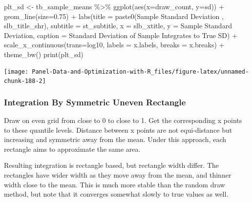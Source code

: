 \documentclass[
]{book}
\newenvironment{Shaded}{\begin{snugshade}}{\end{snugshade}}
\newcommand{\AttributeTok}[1]{\textcolor[rgb]{0.77,0.63,0.00}{#1}}
\newcommand{\FloatTok}[1]{\textcolor[rgb]{0.00,0.00,0.81}{#1}}
\newcommand{\FunctionTok}[1]{\textcolor[rgb]{0.00,0.00,0.00}{#1}}
\newcommand{\NormalTok}[1]{#1}
\newcommand{\OtherTok}[1]{\textcolor[rgb]{0.56,0.35,0.01}{#1}}
\newcommand{\SpecialCharTok}[1]{\textcolor[rgb]{0.00,0.00,0.00}{#1}}
\newcommand{\StringTok}[1]{\textcolor[rgb]{0.31,0.60,0.02}{#1}}
\begin{document}
\begin{Shaded}
\begin{Highlighting}[]
\NormalTok{plt\_sd }\OtherTok{\textless{}{-}}\NormalTok{ tb\_sample\_means }\SpecialCharTok{\%\textgreater{}\%}
  \FunctionTok{ggplot}\NormalTok{(}\FunctionTok{aes}\NormalTok{(}\AttributeTok{x=}\NormalTok{draw\_count, }\AttributeTok{y=}\NormalTok{sd)) }\SpecialCharTok{+}
  \FunctionTok{geom\_line}\NormalTok{(}\AttributeTok{size=}\FloatTok{0.75}\NormalTok{) }\SpecialCharTok{+}
  \FunctionTok{labs}\NormalTok{(}\AttributeTok{title =} \FunctionTok{paste0}\NormalTok{(}\StringTok{\textquotesingle{}Sample Standard Deviation \textquotesingle{}}\NormalTok{, slb\_title\_shr),}
       \AttributeTok{subtitle =}\NormalTok{ st\_subtitle,}
       \AttributeTok{x =}\NormalTok{ slb\_xtitle,}
       \AttributeTok{y =} \StringTok{\textquotesingle{}Sample Standard Deviation\textquotesingle{}}\NormalTok{,}
       \AttributeTok{caption =} \StringTok{\textquotesingle{}Standard Deviation of Sample Integrates to True SD\textquotesingle{}}\NormalTok{) }\SpecialCharTok{+}
  \FunctionTok{scale\_x\_continuous}\NormalTok{(}\AttributeTok{trans=}\StringTok{\textquotesingle{}log10\textquotesingle{}}\NormalTok{, }\AttributeTok{labels =}\NormalTok{ x.labels, }\AttributeTok{breaks =}\NormalTok{ x.breaks) }\SpecialCharTok{+}
  \FunctionTok{theme\_bw}\NormalTok{()}
\FunctionTok{print}\NormalTok{(plt\_sd)}
\end{Highlighting}
\end{Shaded}

\begin{center}\texttt{[image: Panel-Data-and-Optimization-with-R\_files/figure-latex/unnamed-chunk-188-2]} \end{center}

\hypertarget{integration-by-symmetric-uneven-rectangle}{%
\subsubsection{Integration By Symmetric Uneven Rectangle}\label{integration-by-symmetric-uneven-rectangle}}

Draw on even grid from close to 0 to close to 1. Get the corresponding x points to these quantile levels. Distance between x points are not equi-distance but increasing and symmetric away from the mean. Under this approach, each rectangle aims to approximate the same area.

Resulting integration is rectangle based, but rectangle width differ. The rectangles have wider width as they move away from the mean, and thinner width close to the mean. This is much more stable than the random draw method, but note that it converges somewhat slowly to true values as well.
\end{document}
